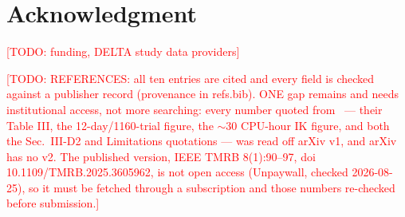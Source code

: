 \documentclass[conference]{IEEEtran}
\newcommand{\todo}[1]{\textcolor{red}{[TODO: #1]}}
\begin{document}
\section*{Acknowledgment}
\todo{funding, DELTA study data providers}

\todo{REFERENCES: all ten entries are cited and every field is checked
against a publisher record (provenance in refs.bib). ONE gap remains and needs
institutional access, not more searching: every number quoted
from~\cite{unger2024} --- their Table III, the 12-day/1160-trial figure, the
${\sim}30$ CPU-hour IK figure, and both the Sec.~III-D2 and Limitations
quotations --- was read off arXiv v1, and arXiv has no v2. The published
version, IEEE TMRB 8(1):90--97, doi 10.1109/TMRB.2025.3605962, is not open
access (Unpaywall, checked 2026-08-25), so it must be fetched through a
subscription and those numbers re-checked before submission.}



\end{document}
